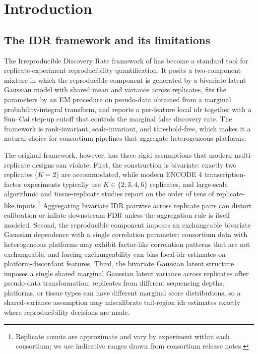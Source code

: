 \section{Introduction}
\label{sec:intro}

\subsection{The IDR framework and its limitations}

The Irreproducible Discovery Rate framework of \citet{LiBrownHuangBickel2011} has become a standard tool for replicate-experiment reproducibility quantification. It posits a two-component mixture in which the reproducible component is generated by a bivariate latent Gaussian model with shared mean and variance across replicates, fits the parameters by an EM procedure on pseudo-data obtained from a marginal probability-integral transform, and reports a per-feature local idr together with a Sun--Cai step-up cutoff that controls the marginal false discovery rate. The framework is rank-invariant, scale-invariant, and threshold-free, which makes it a natural choice for consortium pipelines that aggregate heterogeneous platforms.

The original framework, however, has three rigid assumptions that modern multi-replicate designs can violate. First, the construction is bivariate: exactly two replicates ($K = 2$) are accommodated, while modern ENCODE 4 transcription-factor experiments typically use $K \in \{2, 3, 4, 6\}$ replicates, and large-scale algorithmic and tissue-replicate studies report on the order of tens of replicate-like inputs.\footnote{Replicate counts are approximate and vary by experiment within each consortium; we use indicative ranges drawn from consortium release notes.} Aggregating bivariate IDR pairwise across replicate pairs can distort calibration or inflate downstream FDR unless the aggregation rule is itself modeled. Second, the reproducible component imposes an exchangeable bivariate Gaussian dependence with a single correlation parameter; consortium data with heterogeneous platforms may exhibit factor-like correlation patterns that are not exchangeable, and forcing exchangeability can bias local-idr estimates on platform-discordant features. Third, the bivariate Gaussian latent structure imposes a single shared marginal Gaussian latent variance across replicates after pseudo-data transformation; replicates from different sequencing depths, platforms, or tissue types can have different marginal score distributions, so a shared-variance assumption may miscalibrate tail-region idr estimates exactly where reproducibility decisions are made.

